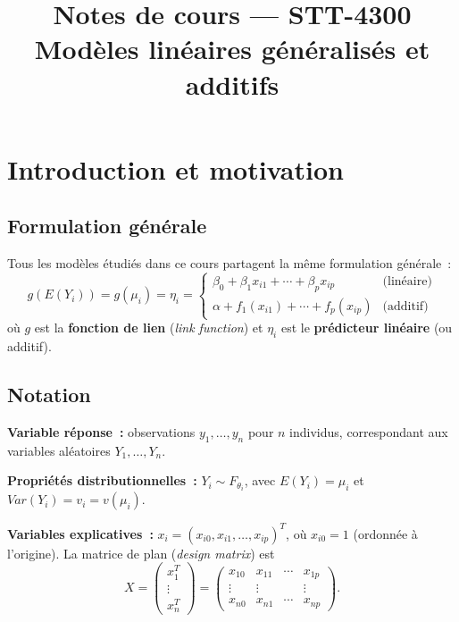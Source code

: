 \documentclass[11pt,letterpaper]{article}
\title{\textbf{Notes de cours --- STT-4300}\\Modèles linéaires généralisés et additifs}
\author{}
\date{}
\begin{document}
\maketitle
\tableofcontents
\newpage

\section{Introduction et motivation}

\subsection{Formulation générale}

Tous les modèles étudiés dans ce cours partagent la même formulation générale~:
$$g(E(Y_i)) = g(\mu_i) = \eta_i = \begin{cases}
\beta_0 + \beta_1 x_{i1} + \cdots + \beta_p x_{ip} & \text{(linéaire)}\\
\alpha + f_1(x_{i1}) + \cdots + f_p(x_{ip}) & \text{(additif)}
\end{cases}$$
où $g$ est la \textbf{fonction de lien} (\textit{link function}) et $\eta_i$ est le \textbf{prédicteur linéaire} (ou additif).

\subsection{Notation}

\textbf{Variable réponse~:} observations $y_1,\ldots,y_n$ pour $n$ individus, correspondant aux variables aléatoires $Y_1,\ldots,Y_n$.

\textbf{Propriétés distributionnelles~:} $Y_i \sim F_{\theta_i}$, avec $E(Y_i) = \mu_i$ et $Var(Y_i) = v_i = v(\mu_i)$.

\textbf{Variables explicatives~:} $x_i = (x_{i0}, x_{i1},\ldots,x_{ip})^T$, où $x_{i0}=1$ (ordonnée à l'origine). La matrice de plan (\textit{design matrix}) est
$$X = \begin{pmatrix} x_1^T \\ \vdots \\ x_n^T \end{pmatrix} = \begin{pmatrix} x_{10} & x_{11} & \cdots & x_{1p} \\ \vdots & \vdots & & \vdots \\ x_{n0} & x_{n1} & \cdots & x_{np}\end{pmatrix}.$$
\end{document}
